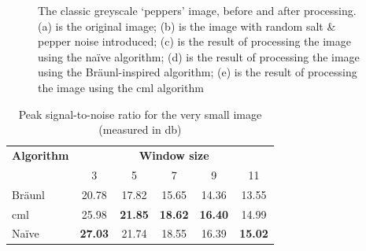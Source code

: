 \begin{figure}
\caption[The classic grayscale `peppers' image, before and after processing]{\label{fig:median:peppers}The classic greyscale `peppers' image, before and after processing.  (a) is the original image; (b) is the image with random salt \& pepper noise introduced; (c) is the result of processing the image using the naïve algorithm; (d) is the result of processing the image using the Br\"{a}unl-inspired algorithm; (e) is the result of processing the image using the \gls{cml} algorithm}
\end{figure}

\begin{table}
\centering
\caption[Peak signal-to-noise for the very small image]{Peak signal-to-noise ratio for the very small image (measured in \unit{\decibel})}
\label{tab:median:psnrvsmall}
\begin{tabular}{@{}lccccc@{}}
\toprule
\multicolumn{1}{c}{\textbf{Algorithm}} & \multicolumn{5}{c}{\textbf{Window size}}                                          \\
                                       & 3              & 5              & 7              & 9             & 11             \\ \midrule
Bräunl                                 & 20.78          & 17.82          & 15.65          & 14.36         & 13.55          \\
\gls{cml}                                    & 25.98          & \textbf{21.85} & \textbf{18.62} & \textbf{16.40} & 14.99          \\
Naïve                                  & \textbf{27.03} & 21.74          & 18.55          & 16.39         & \textbf{15.02} \\ \bottomrule
\end{tabular}
\end{table}

